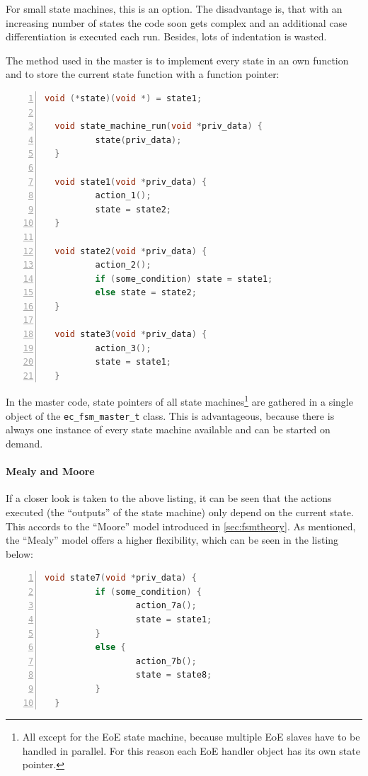 \documentclass[a4paper,12pt,BCOR6mm,bibtotoc,idxtotoc]{scrbook}
\begin{document}
For small state machines, this is an option. The disadvantage is, that
with an increasing number of states the code soon gets complex and an
additional case differentiation is executed each run. Besides, lots of
indentation is wasted.

The method used in the master is to implement every state in an own
function and to store the current state function with a function
pointer:

\begin{lstlisting}[gobble=2,language=C,numbers=left]
  void (*state)(void *) = state1;

  void state_machine_run(void *priv_data) {
          state(priv_data);
  }

  void state1(void *priv_data) {
          action_1();
          state = state2;
  }

  void state2(void *priv_data) {
          action_2();
          if (some_condition) state = state1;
          else state = state2;
  }

  void state3(void *priv_data) {
          action_3();
          state = state1;
  }
\end{lstlisting}

In the master code, state pointers of all state machines\footnote{All except
for the EoE state machine, because multiple EoE slaves have to be handled in
parallel. For this reason each EoE handler object has its own state pointer.}
are gathered in a single object of the \lstinline+ec_fsm_master_t+ class. This
is advantageous, because there is always one instance of every state machine
available and can be started on demand.

\paragraph{Mealy and Moore}

If a closer look is taken to the above listing, it can be seen that the
actions executed (the ``outputs'' of the state machine) only depend on the
current state. This accords to the ``Moore'' model introduced in
\autoref{sec:fsmtheory}. As mentioned, the ``Mealy'' model offers a higher
flexibility, which can be seen in the listing below:

\begin{lstlisting}[gobble=2,language=C,numbers=left]
  void state7(void *priv_data) {
          if (some_condition) {
                  action_7a();
                  state = state1;
          }
          else {
                  action_7b();
                  state = state8;
          }
  }
\end{lstlisting}
\end{document}
